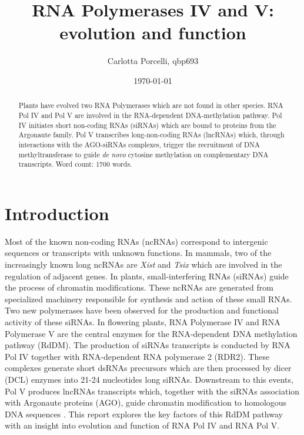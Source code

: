 \documentclass[a4paper, twocolumn]{article}
\title{RNA Polymerases IV and V: evolution and function}
\author{Carlotta Porcelli, qbp693}
\date{\today}
\begin{document}
\maketitle

\begin{abstract}
Plants have evolved two RNA Polymerases which are not found in other species. RNA Pol IV and Pol V are involved in the RNA-dependent DNA-methylation pathway. 
Pol IV initiates short non-coding RNAs (siRNAs) which are bound to proteins from the Argonaute family. Pol V transcribes long-non-coding RNAs (lncRNAs) which, through  interactions with the AGO-siRNAs complexes, trigger the recruitment of DNA methyltransferase to guide \textit{de novo} cytosine methylation on complementary DNA transcripts. 
Word count: 1700 words.
\end{abstract}

\section{Introduction}
Most of the known non-coding RNAs (ncRNAs) correspond to intergenic sequences or transcripts with unknown functions. In mammals, two of the increasingly known long ncRNAs are \textit{Xist} and \textit{Tsix} which are involved in the regulation of adjacent genes. 
In plants, small-interfering RNAs (siRNAs) guide the process of chromatin modifications. These ncRNAs are generated from specialized machinery responsible for synthesis and action of these small RNAs. Two new polymerases have been observed for the production and functional activity of these siRNAs. In flowering plants, RNA Polymerase IV and RNA Polymerase V are the central enzymes for the RNA-dependent DNA methylation pathway (RdDM). The production of siRNAs transcripts is conducted by RNA Pol IV together with  RNA-dependent RNA polymerase 2 (RDR2). These complexes generate short dsRNAs precursors which are then processed by dicer (DCL) enzymes into 21-24 nucleotides long siRNAs. Downstream to this events, Pol V produces lncRNAs transcripts which, together with the siRNAs association with Argonaute proteins (AGO), guide chromatin modification to homologous DNA sequences \cite{Wierzbicki2009}. 
This report explores the key factors of this RdDM pathway with an insight into evolution and function of RNA Pol IV and RNA Pol V.
\end{document}
